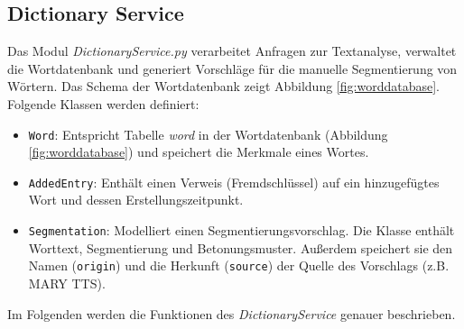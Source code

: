 \subsection{Dictionary Service}
\label{sec:dictionary-service}

Das Modul \textit{DictionaryService.py} verarbeitet Anfragen zur Textanalyse, verwaltet die Wortdatenbank und generiert Vorschläge für die manuelle Segmentierung von Wörtern. Das Schema der Wortdatenbank zeigt Abbildung \ref{fig:worddatabase}. Folgende Klassen werden definiert:
\begin{itemize}
	\item \texttt{Word}: Entspricht Tabelle \textit{word} in der Wortdatenbank (Abbildung \ref{fig:worddatabase}) und speichert die Merkmale eines Wortes.
	\item \texttt{AddedEntry}: Enthält einen Verweis (Fremdschlüssel) auf ein hinzugefügtes Wort und dessen Erstellungszeitpunkt.
	\item \texttt{Segmentation}: Modelliert einen Segmentierungsvorschlag. Die Klasse enthält Worttext, Segmentierung und Betonungsmuster. Außerdem speichert sie den Namen (\texttt{origin}) und die Herkunft (\texttt{source}) der Quelle des Vorschlags (z.B. MARY TTS).
\end{itemize}

Im Folgenden werden die Funktionen des \textit{DictionaryService} genauer beschrieben.

